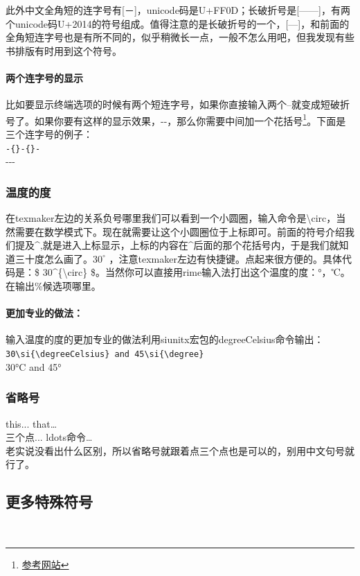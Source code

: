 \documentclass[12pt,oneside]{book}
\begin{document}
\begin{common-format}
此外中文全角短的连字号有[－]，unicode码是U+FF0D；长破折号是[——]，有两个unicode码U+2014的符号组成。值得注意的是长破折号的一个，[—]，和前面的全角短连字号也是有所不同的，似乎稍微长一点，一般不怎么用吧，但我发现有些书排版有时用到这个符号。

\paragraph{两个连字号的显示}
比如要显示终端选项的时候有两个短连字号，如果你直接输入两个--就变成短破折号了。如果你要有这样的显示效果，-{}-，那么你需要中间加一个花括号\footnote{\href{http://tex.stackexchange.com/questions/9813/how-can-i-stop-latex-from-converting-two-hyphens-to-a-single-hyphen-when-loading}{参考网站}}。下面是三个连字号的例子：\\
\verb+-{}-{}-+\\
-{}-{}-


\subsubsection{温度的度}
在texmaker左边的关系负号哪里我们可以看到一个小圆圈，输入命令是\textbackslash circ，当然需要在数学模式下。现在就需要让这个小圆圈位于上标即可。前面的符号介绍我们提及\^{},就是进入上标显示，上标的内容在\^{}后面的那个花括号内，于是我们就知道三十度怎么画了。$ 30^{\circ} $ ，注意texmaker左边有快捷键。点起来很方便的。具体代码是：\$ 30\^{}\{\textbackslash circ\} \$。当然你可以直接用rime输入法打出这个温度的度：°，℃。在输出\%候选项哪里。

\paragraph{更加专业的做法：}
输入温度的度的更加专业的做法利用siunitx宏包的degreeCelsius命令输出：\\
\verb+30\si{\degreeCelsius} and 45\si{\degree}+\\
30\si{\degreeCelsius} and 45\si{\degree}


\subsubsection{省略号}
this...   that\ldots   \\
三个点...   ldots命令\ldots  \\
老实说没看出什么区别，所以省略号就跟着点三个点也是可以的，别用中文句号就行了。



\subsection{更多特殊符号}
{\fontsize{40pt}{20pt}\selectfont \color[HTML]{DE4815}  }


\end{common-format}
\end{document}
